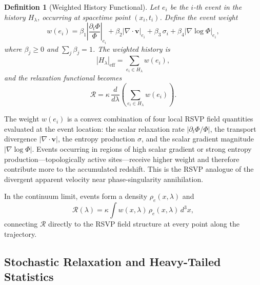 \documentclass[12pt,a4paper]{article}
\newtheorem{definition}[theorem]{Definition}
\theoremstyle{remark}
\newcommand{\vv}{\mathbf{v}}
\newcommand{\Rcal}{\mathcal{R}}
\begin{document}
\begin{definition}[Weighted History Functional]
Let $e_i$ be the $i$-th event in the history $H_\lambda$, occurring at
spacetime point $(x_i, t_i)$. Define the event weight
\begin{equation}
w(e_i) = \beta_1 \left|\frac{\partial_t\Phi}{\Phi}\right|_{e_i}
        + \beta_2 \left|\nabla\cdot\vv\right|_{e_i}
        + \beta_3 \,\sigma_i
        + \beta_4 \left|\nabla\log\Phi\right|_{e_i},
\label{eq:weight}
\end{equation}
where $\beta_j \ge 0$ and $\sum_j \beta_j = 1$. The weighted history is
\begin{equation}
|H_\lambda|_{\mathrm{eff}} = \sum_{e_i \in H_\lambda} w(e_i),
\end{equation}
and the relaxation functional becomes
\begin{equation}
\boxed{\Rcal = \kappa\,\frac{d}{d\lambda}\!\left(\sum_{e_i \in H_\lambda} w(e_i)\right).}
\label{eq:R_weighted}
\end{equation}
\end{definition}

The weight $w(e_i)$ is a convex combination of four local RSVP field quantities
evaluated at the event location: the scalar relaxation rate $|\partial_t\Phi/\Phi|$,
the transport divergence $|\nabla\cdot\vv|$, the entropy production $\sigma$,
and the scalar gradient magnitude $|\nabla\log\Phi|$. Events occurring in
regions of high scalar gradient or strong entropy production---topologically
active sites---receive higher weight and therefore contribute more to the
accumulated redshift. This is the RSVP analogue of the divergent apparent
velocity near phase-singularity annihilation.

In the continuum limit, events form a density $\rho_e(x,\lambda)$ and
\begin{equation}
\Rcal(\lambda) = \kappa\int w(x,\lambda)\,\rho_e(x,\lambda)\, d^3x,
\label{eq:R_continuum}
\end{equation}
connecting $\Rcal$ directly to the RSVP field structure at every point along
the trajectory.

\subsection{Stochastic Relaxation and Heavy-Tailed Statistics}
\end{document}
